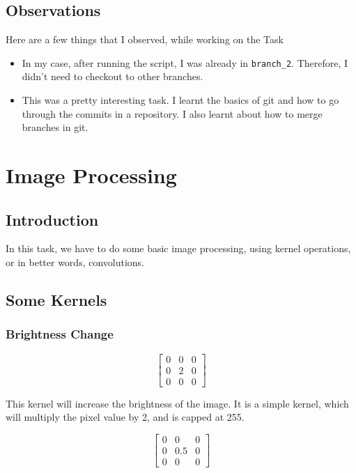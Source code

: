 \documentclass[12pt]{report}
\begin{document}
\section{Observations}

Here are a few things that I observed, while working on the Task

\begin{itemize}
    \item In my case, after running the script, I was already in \texttt{branch\_2}. Therefore, I didn't need to checkout to other branches.
    \item This was a pretty interesting task. I learnt the basics of git and how to go through the commits in a repository. I also learnt about how to merge branches in git.
\end{itemize}

\newpage

\chapter{Image Processing}

\section{Introduction}

In this task, we have to do some basic image processing, using kernel operations, or in better words, convolutions.

\section{Some Kernels}

\subsection{Brightness Change}

\begin{equation*}
    \begin{bmatrix}
        0 & 0 & 0 \\
        0 & 2 & 0 \\
        0 & 0 & 0
    \end{bmatrix}
\end{equation*}

This kernel will increase the brightness of the image. It is a simple kernel, which will multiply the pixel value by 2, and is capped at 255.

\begin{equation*}
    \begin{bmatrix}
        0 & 0   & 0 \\
        0 & 0.5 & 0 \\
        0 & 0   & 0
    \end{bmatrix}
\end{equation*}
\end{document}
